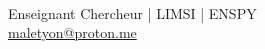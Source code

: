 \begin{titlepage}
\vspace{0.9cm}

\begin{center}
    {\large\bfseries\color{CouleurPrimaire}
        \auteurcours}\\[0.5ex]
    {\normalsize\color{CouleurSecondaire}
       Enseignant Chercheur | LIMSI | ENSPY}\\[0.2ex]
    {\small\color{CouleurBordInfo}
        \href{mailto:maletyon@proton.me}{maletyon@proton.me}}
\end{center}

\end{titlepage}
